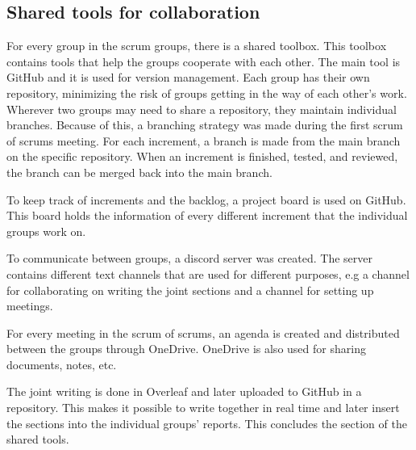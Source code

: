 \subsection{Shared tools for collaboration}\label{sub:shared-tools-for-collaboration}
For every group in the scrum groups, there is a shared toolbox.
This toolbox contains tools that help the groups cooperate with each other.
The main tool is GitHub and it is used for version management.  
Each group has their own repository, minimizing the risk of groups getting in the way of each other's work.
Wherever two groups may need to share a repository, they maintain individual branches.
Because of this, a branching strategy was made during the first scrum of scrums meeting.
For each increment, a branch is made from the main branch on the specific repository. 
When an increment is finished, tested, and reviewed, the branch can be merged back into the main branch.

To keep track of increments and the backlog, a project board is used on GitHub.
This board holds the information of every different increment that the individual groups work on.

To communicate between groups, a discord server was created.
The server contains different text channels that are used for different purposes, e.g a channel for collaborating on writing the joint sections and a channel for setting up meetings.

For every meeting in the scrum of scrums, an agenda is created and distributed between the groups through OneDrive.
OneDrive is also used for sharing documents, notes, etc.

The joint writing is done in Overleaf and later uploaded to GitHub in a repository.
This makes it possible to write together in real time and later insert the sections into the individual groups' reports.
This concludes the section of the shared tools.

